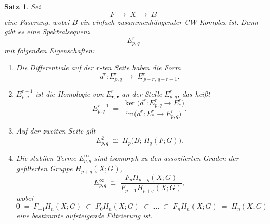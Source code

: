 \documentclass[12pt, hidelinks]{article}
\numberwithin{conj}{section}
\newtheorem{theorem}[conj]{Satz}
\begin{document}
                \begin{theorem}{\cite[Proposition 4E.1]{hatcher2001}}
                    \label{thm:SerreSpectralSequence}
                    Sei 
                    \[
                        F \;\longrightarrow\; X \;\longrightarrow\; B
                    \]
                    eine Faserung, wobei $B$ ein einfach zusammenhängender CW-Komplex ist. Dann gibt es eine Spektralsequenz 
                    \[
                        E^r_{p,q}
                    \]
                    mit folgenden Eigenschaften:
                    \begin{enumerate}[label=(\alph*)]
                        \item Die Differentiale auf der $r$-ten Seite haben die Form
                              \[
                                d^r : E^r_{p,q} \;\longrightarrow\; E^r_{\,p-r,\,q+r-1}.
                              \]
                        \item $E^{r+1}_{p,q}$ ist die Homologie von $E^r_{\bullet,\bullet}$ an der Stelle $E^r_{p,q}$, 
                              das heißt
                              \[
                                E^{r+1}_{p,q}
                                \;=\;
                                \frac{\ker\bigl(d^r : E^r_{p,q} \to E^r_{\!*}\bigr)}{\mathrm{im}\bigl(d^r : E^r_{\!*} \to E^r_{p,q}\bigr)}.
                              \]
                        \item Auf der zweiten Seite gilt
                              \[
                                E^2_{p,q}
                                \;\cong\;
                                H_{p}\bigl(B;\,H_{q}(F;G)\bigr).
                              \]
                        \item Die stabilen Terme $E^\infty_{p,q}$ sind isomorph zu den assoziierten Graden der gefilterten Gruppe $H_{p+q}(X;G)$,
                              \[
                                E^\infty_{p,q}
                                \;\cong\;
                                \frac{F_pH_{p+q}(X;G)}{F_{p-1}H_{p+q}(X;G)},
                              \]
                              wobei 
                              \[
                                0
                                \;=\;
                                F_{-1}H_{n}(X;G)
                                \;\subset\;
                                F_0H_{n}(X;G)
                                \;\subset\;
                                \dots
                                \;\subset\;
                                F_nH_{n}(X;G)
                                \;=\;
                                H_{n}(X;G)
                              \]
                              eine bestimmte aufsteigende Filtrierung ist.
                    \end{enumerate}
                \end{theorem}
                
\end{document}
